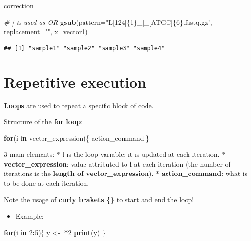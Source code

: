 \documentclass[]{book}
\newenvironment{Shaded}{\begin{snugshade}}{\end{snugshade}}
\newcommand{\CommentTok}[1]{\textcolor[rgb]{0.56,0.35,0.01}{\textit{#1}}}
\newcommand{\ControlFlowTok}[1]{\textcolor[rgb]{0.13,0.29,0.53}{\textbf{#1}}}
\newcommand{\DataTypeTok}[1]{\textcolor[rgb]{0.13,0.29,0.53}{#1}}
\newcommand{\DecValTok}[1]{\textcolor[rgb]{0.00,0.00,0.81}{#1}}
\newcommand{\KeywordTok}[1]{\textcolor[rgb]{0.13,0.29,0.53}{\textbf{#1}}}
\newcommand{\NormalTok}[1]{#1}
\newcommand{\OperatorTok}[1]{\textcolor[rgb]{0.81,0.36,0.00}{\textbf{#1}}}
\newcommand{\StringTok}[1]{\textcolor[rgb]{0.31,0.60,0.02}{#1}}
\providecommand{\tightlist}{%
  \setlength{\itemsep}{0pt}\setlength{\parskip}{0pt}}
\begin{document}
correction

\begin{Shaded}
\begin{Highlighting}[]
\CommentTok{# | is used as OR}
\KeywordTok{gsub}\NormalTok{(}\DataTypeTok{pattern=}\StringTok{"L[124]\{1\}_|_[ATGC]\{6\}.fastq.gz"}\NormalTok{, }
    \DataTypeTok{replacement=}\StringTok{""}\NormalTok{, }
    \DataTypeTok{x=}\NormalTok{vector1)}
\end{Highlighting}
\end{Shaded}

\begin{verbatim}
## [1] "sample1" "sample2" "sample3" "sample4"
\end{verbatim}

\hypertarget{repetitive-execution}{%
\chapter{Repetitive execution}\label{repetitive-execution}}

\textbf{Loops} are used to repeat a specific block of code.

Structure of the \textbf{for loop}:

\begin{Shaded}
\begin{Highlighting}[]
\ControlFlowTok{for}\NormalTok{(i }\ControlFlowTok{in}\NormalTok{ vector_expression)\{}
\NormalTok{    action_command}
\NormalTok{\}}
\end{Highlighting}
\end{Shaded}

3 main elements:
* \textbf{i} is the loop variable: it is updated at each iteration.
* \textbf{vector\_expression}: value attributed to \textbf{i} at each iteration (the number of iterations is the \textbf{length of vector\_expression}).
* \textbf{action\_command}: what is to be done at each iteration.

Note the usage of \textbf{curly brakets \{\}} to start and end the loop!

\begin{itemize}
\tightlist
\item
  Example:
\end{itemize}

\begin{Shaded}
\begin{Highlighting}[]
\ControlFlowTok{for}\NormalTok{(i }\ControlFlowTok{in} \DecValTok{2}\OperatorTok{:}\DecValTok{5}\NormalTok{)\{}
\NormalTok{    y <-}\StringTok{ }\NormalTok{i}\OperatorTok{*}\DecValTok{2}
    \KeywordTok{print}\NormalTok{(y)}
\NormalTok{\}}
\end{Highlighting}
\end{Shaded}
\end{document}
